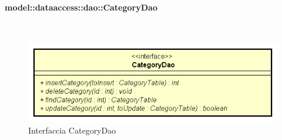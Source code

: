\documentclass[../DefinizioneDiProdotto.tex]{subfiles}
\begin{document}
\paragraph{model::dataaccess::dao::CategoryDao}
\
\begin{figure}[H]
	\centering
	\includegraphics[width=\maxwidth]{img/CategoryDao.png}
	\caption{Interfaccia CategoryDao}\label{fig:model::dataaccess::dao::CategoryDao} 
\end{figure}
\end{document}
